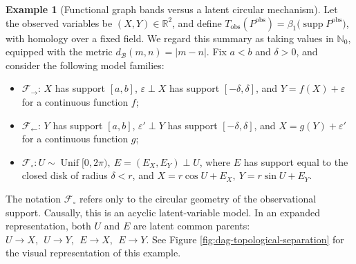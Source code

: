 \documentclass[11pt,a4paper]{article}
\theoremstyle{plain}
\theoremstyle{definition}
\newtheorem{example}[theorem]{Example}
\theoremstyle{remark}
\newcommand{\1}{\mathbbm{1}}
\begin{document}
\begin{example}[Functional graph bands versus a latent circular mechanism]
\label{ex:functional-latent-circle}
Let the observed variables be \((X,Y)\in\mathbb R^2\), and
define \(T_{\mathrm{obs}}(P^{\mathrm{obs}}) = \beta_1\bigl(\operatorname{supp}P^{\mathrm{obs}}\bigr)\), with homology over a fixed field. We regard this summary as
taking values in \(\mathbb N_0\), equipped with the metric
\(d_{\mathcal B}(m,n)=|m-n|\). Fix \(a<b\) and
\(\delta>0\), and consider the following model families:

\begin{itemize}
\item \(\mathcal F_\to\): \(X\) has support \([a,b]\),
\(\varepsilon\perp X\) has support \([-\delta,\delta]\), and
\(Y=f(X)+\varepsilon\) for a continuous function \(f\);

\item \(\mathcal F_\leftarrow\): \(Y\) has support
\([a,b]\), \(\varepsilon'\perp Y\) has support
\([-\delta,\delta]\), and
\(X=g(Y)+\varepsilon'\) for a continuous function \(g\);

\item \(\mathcal F_\circ: U\sim\operatorname{Unif}[0,2\pi),
\ E=(E_X,E_Y)\perp U\), where \(E\) has support equal to the closed disk of radius \(\delta<r\), and
\(X=r\cos U+E_X, \ Y=r\sin U+E_Y\).
\end{itemize}

The notation \(\mathcal F_\circ\) refers only to the circular
geometry of the observational support. Causally, this is an
acyclic latent-variable model. In an expanded representation,
both \(U\) and \(E\) are latent common parents:
\(U\longrightarrow X, \ \ U\longrightarrow Y, \ \ E\longrightarrow X, \ \ E\longrightarrow Y\). See Figure \ref{fig:dag-topological-separation} for the visual representation of this example.

\begin{figure}[ht]
\centering
{}
\end{figure}
\end{example}
\end{document}
